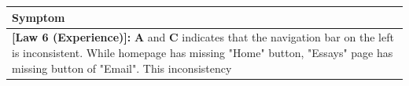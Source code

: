 \documentclass[a4paper,12pt,oneside]{scrreprt}
\begin{document}
\bigskip

\bigskip

\begin{tabularx}{\textwidth}{|X|}
	\hline
	\textbf{Symptom}\\
	\hline
	\textbf{{[Law 6 (Experience)]:}} \textbf{A} and \textbf{C} indicates that the navigation bar on the left is inconsistent. While homepage has missing "Home" button, "Essays" page has missing button of "Email". This inconsistency  \\
	\hline
\end{tabularx}
\end{document}
